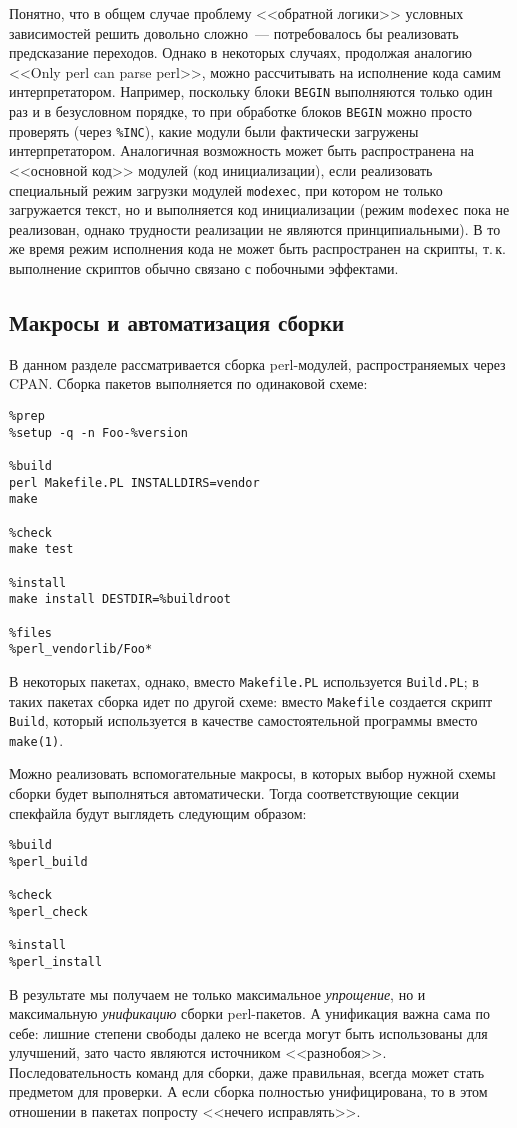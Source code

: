 \documentclass[russian,a4paper,12pt,titlepage]{article}
\begin{document}
Понятно, что в общем случае проблему <<обратной логики>> условных зависимостей решить довольно сложно~--- потребовалось
бы реализовать предсказание переходов.  Однако в некоторых случаях, продолжая аналогию <<Only perl can parse perl>>, можно
рассчитывать на исполнение кода самим интерпретатором.  Например, поскольку блоки \verb|BEGIN| выполняются только один раз и
в безусловном порядке, то при обработке блоков \verb|BEGIN| можно просто проверять (через \verb|%INC|), какие модули были
фактически загружены интерпретатором.  Аналогичная возможность может быть распространена на <<основной код>> модулей
(код инициализации), если реализовать специальный режим загрузки модулей \verb|modexec|, при котором не только загружается
текст, но и выполняется код инициализации (режим \verb|modexec| пока не реализован, однако трудности реализации не являются
принципиальными).  В то же время режим исполнения кода не может быть распространен на скрипты, т.\,к. выполнение
скриптов обычно связано с побочными эффектами.

\subsection{Макросы и автоматизация сборки}
\label{perl-macros}

В данном разделе рассматривается сборка perl-модулей, распространяемых через CPAN.
Сборка пакетов выполняется по одинаковой схеме:
\begin{verbatim}
%prep
%setup -q -n Foo-%version

%build
perl Makefile.PL INSTALLDIRS=vendor
make

%check
make test

%install
make install DESTDIR=%buildroot

%files
%perl_vendorlib/Foo*
\end{verbatim}

В некоторых пакетах, однако, вместо \verb|Makefile.PL| используется \verb|Build.PL|;
в таких пакетах сборка идет по другой схеме: вместо \verb|Makefile| создается скрипт \verb|Build|,
который используется в качестве самостоятельной программы вместо \verb|make(1)|.

Можно реализовать вспомогательные макросы, в которых выбор нужной схемы сборки будет выполняться
автоматически.  Тогда соответствующие секции спекфайла будут выглядеть следующим образом:
\begin{verbatim}
%build
%perl_build

%check
%perl_check

%install
%perl_install
\end{verbatim}
В результате мы получаем не только максимальное \emph{упрощение}, но и максимальную \emph{унификацию}
сборки perl-пакетов.  А унификация важна сама по себе: лишние степени свободы
далеко не всегда могут быть использованы для улучшений, зато часто являются источником <<разнобоя>>.
Последовательность команд для сборки, даже правильная, всегда может стать предметом для проверки.
А если сборка полностью унифицирована, то в этом отношении в пакетах попросту <<нечего исправлять>>.
\end{document}
